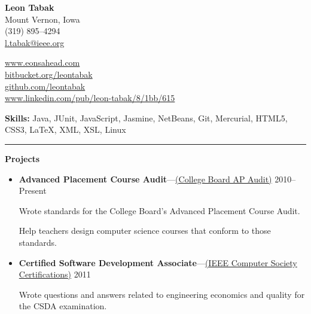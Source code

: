 \documentclass[twoside,10pt]{article}
\newcommand{\mycategory}[1]{{\color{mycategorycolor}\large \textbf{#1}}}
\newcommand{\myrule}{\begin{center}\rule{18cm}{0.04cm}\end{center}}
\newcommand{\myproject}[4]{\textbf{#1}---\href{#2}{(#3)} \hfill #4}
\newcommand{\myskills}[1]{{\color{mycategorycolor}\large \textbf{Skills:}} #1}
\begin{document}
\begin{minipage}[t]{10cm}
{\Large \textbf{\color{mynamecolor}Leon Tabak}} \\
Mount Vernon, Iowa \\
(319) 895--4294 \\
\href{mailto:l.tabak@ieee.org}{l.tabak@ieee.org} \\
\end{minipage}
\begin{minipage}[t]{10cm}
\href{http://www.eonsahead.com}{www.eonsahead.com} \\
\href{https://bitbucket.org/leontabak}{bitbucket.org/leontabak} \\
\href{https://github.com/leontabak}{github.com/leontabak} \\
\href{https://www.linkedin.com/pub/leon-tabak/8/1bb/615}{www.linkedin.com/pub/leon-tabak/8/1bb/615}
\end{minipage}


\myskills{Java, JUnit, JavaScript, Jasmine, NetBeans, Git, Mercurial, HTML5, CSS3, \LaTeX, XML, XSL, Linux}

\myrule

\mycategory{Projects}

\begin{itemize}[label={$\triangleright$}] \itemsep1pt \parskip3pt 
  \item \myproject{Advanced Placement Course Audit}{http://www.collegeboard.com/html/apcourseaudit/}
    {College Board AP Audit}{2010--Present}

    Wrote standards for the College Board's Advanced Placement
    Course Audit.

    Help teachers design computer science courses that
    conform to those standards.

  \item \myproject{Certified Software Development Associate}
    {http://www.computer.org/web/education/certifications/}{IEEE Computer Society Certifications}{2011}

    Wrote questions and answers related to engineering economics and quality
    for the CSDA examination.
  \end{itemize}
 


\end{document}
